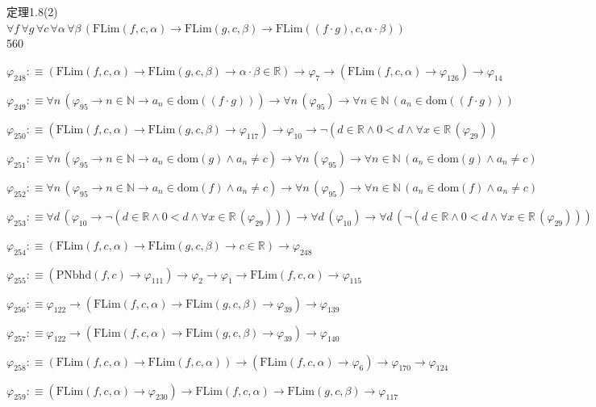 \begin{fullproof}{定理1.8(2)}{$\forall f\,\forall g\,\forall c\,\forall \alpha\,\forall \beta\,(\mathrm{FLim}(f,c,\alpha) \to \mathrm{FLim}(g,c,\beta) \to \mathrm{FLim}((f \cdot g),c,\alpha \cdot \beta))$}{560}
\begin{abbrevlist}
\item $\varphi_{248} :\equiv (\mathrm{FLim}(f,c,\alpha) \to \mathrm{FLim}(g,c,\beta) \to \alpha \cdot \beta \in \mathbb{R}) \to \varphi_{7} \to (\mathrm{FLim}(f,c,\alpha) \to \varphi_{126}) \to \varphi_{14}$
\item $\varphi_{249} :\equiv \forall n\,(\varphi_{95} \to n \in \mathbb{N} \to a_{n} \in \mathrm{dom}((f \cdot g))) \to \forall n\,(\varphi_{95}) \to \forall n \in \mathbb{N}\,(a_{n} \in \mathrm{dom}((f \cdot g)))$
\item $\varphi_{250} :\equiv (\mathrm{FLim}(f,c,\alpha) \to \mathrm{FLim}(g,c,\beta) \to \varphi_{117}) \to \varphi_{10} \to \neg (d \in \mathbb{R} \land 0 < d \land \forall x \in \mathbb{R}\,(\varphi_{29}))$
\item $\varphi_{251} :\equiv \forall n\,(\varphi_{95} \to n \in \mathbb{N} \to a_{n} \in \mathrm{dom}(g) \land a_{n} \neq c) \to \forall n\,(\varphi_{95}) \to \forall n \in \mathbb{N}\,(a_{n} \in \mathrm{dom}(g) \land a_{n} \neq c)$
\item $\varphi_{252} :\equiv \forall n\,(\varphi_{95} \to n \in \mathbb{N} \to a_{n} \in \mathrm{dom}(f) \land a_{n} \neq c) \to \forall n\,(\varphi_{95}) \to \forall n \in \mathbb{N}\,(a_{n} \in \mathrm{dom}(f) \land a_{n} \neq c)$
\item $\varphi_{253} :\equiv \forall d\,(\varphi_{10} \to \neg (d \in \mathbb{R} \land 0 < d \land \forall x \in \mathbb{R}\,(\varphi_{29}))) \to \forall d\,(\varphi_{10}) \to \forall d\,(\neg (d \in \mathbb{R} \land 0 < d \land \forall x \in \mathbb{R}\,(\varphi_{29})))$
\item $\varphi_{254} :\equiv (\mathrm{FLim}(f,c,\alpha) \to \mathrm{FLim}(g,c,\beta) \to c \in \mathbb{R}) \to \varphi_{248}$
\item $\varphi_{255} :\equiv (\mathrm{PNbhd}(f,c) \to \varphi_{111}) \to \varphi_{2} \to \varphi_{1} \to \mathrm{FLim}(f,c,\alpha) \to \varphi_{115}$
\item $\varphi_{256} :\equiv \varphi_{122} \to (\mathrm{FLim}(f,c,\alpha) \to \mathrm{FLim}(g,c,\beta) \to \varphi_{39}) \to \varphi_{139}$
\item $\varphi_{257} :\equiv \varphi_{122} \to (\mathrm{FLim}(f,c,\alpha) \to \mathrm{FLim}(g,c,\beta) \to \varphi_{39}) \to \varphi_{140}$
\item $\varphi_{258} :\equiv (\mathrm{FLim}(f,c,\alpha) \to \mathrm{FLim}(f,c,\alpha)) \to (\mathrm{FLim}(f,c,\alpha) \to \varphi_{6}) \to \varphi_{170} \to \varphi_{124}$
\item $\varphi_{259} :\equiv (\mathrm{FLim}(f,c,\alpha) \to \varphi_{230}) \to \mathrm{FLim}(f,c,\alpha) \to \mathrm{FLim}(g,c,\beta) \to \varphi_{117}$

\end{abbrevlist}
\end{fullproof}
